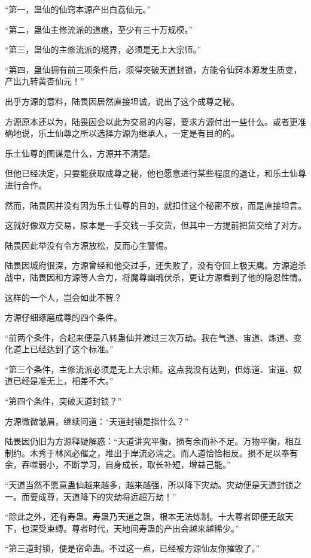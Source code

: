 \begin{this_body}
“第一，蛊仙的仙窍本源产出白荔仙元。”

“第二，蛊仙主修流派的道痕，至少有三十万规模。”

“第三，蛊仙的主修流派的境界，必须是无上大宗师。”

“第四，蛊仙拥有前三项条件后，须得突破天道封锁，方能令仙窍本源发生质变，产出九转黄杏仙元！”

出乎方源的意料，陆畏因居然直接坦诚，说出了这个成尊之秘。

方源原本还以为，陆畏因会以此为交易的内容，要求方源付出一些什么。或者更准确地说，乐土仙尊之所以选择方源为继承人，一定是有目的的。

乐土仙尊的图谋是什么，方源并不清楚。

但他已经决定，只要能获取成尊之秘，他也愿意进行某些程度的退让，和乐土仙尊进行合作。

然而，陆畏因并没有因为乐土仙尊的目的，就扣住这个秘密不放，而是直接坦言。

这就好像双方交易，原本是一手交钱一手交货，但其中一方提前把货交给了对方。

陆畏因此举没有令方源放松，反而心生警惕。

陆畏因城府很深，方源曾经和他交过手，还失败了，没有夺回上极天鹰。方源追杀战中，陆畏因和方源等人合力，将魔尊幽魂伏杀，更让方源看到了他的隐忍性情。

这样的一个人，岂会如此不智？

方源仔细琢磨成尊的四个条件。

“前两个条件，合起来便是八转蛊仙并渡过三次万劫。我在气道、宙道、炼道、变化道上已经达到了这个标准。”

“第三个条件，主修流派必须是无上大宗师。这点我没有达到，但炼道、宙道、奴道已经是准无上，相差不大。”

“第四个条件，突破天道封锁？”

方源微微皱眉，继续问道：“天道封锁是指什么？”

陆畏因仍旧为方源释疑解惑：“天道讲究平衡，损有余而补不足。万物平衡，相互制约。木秀于林风必催之，堆出于岸流必湍之。而人道恰恰相反。损不足以奉有余，吞噬弱小，不断学习，自身成长，取长补短，增益己能。”

“天道当然不愿意蛊仙越来越多，越来越强，所以降下灾劫。灾劫便是天道封锁之一。而要成尊，天道降下的灾劫将远超万劫！”

“除此之外，还有寿蛊。寿蛊乃天道之蛊，根本无法炼制。十大尊者即便无敌天下，也深受束缚。尊者时代，天地间寿蛊的产出会越来越稀少。”

“第三道封锁，便是宿命蛊。不过这一点，已经被方源仙友你摧毁了。”


\end{this_body}
